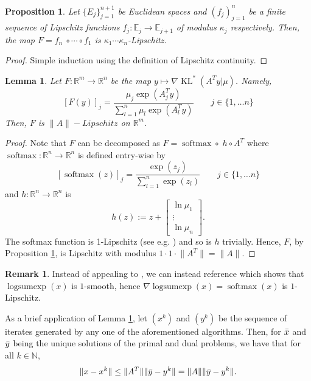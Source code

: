 \documentclass[10pt,a4paper]{article}
\numberwithin{equation}{section}
\newtheorem{proposition}[theorem]{Proposition}
\newtheorem{lemma}[theorem]{Lemma}
\theoremstyle{definition}
\newtheorem{remark}[theorem]{Remark}
\def\rr{{\mathbb R}}
\def\nn{{\mathbb N}}
\def\ee{{\mathbb E}}
\DeclareMathOperator{\logsumexp}{logsumexp}
\DeclareMathOperator{\softmax}{softmax}
\DeclareMathOperator{\KL}{KL}
\begin{document}
\begin{proposition}\label{prop:lipschitz_composition}
    Let $\{E_j\}_{j=1}^{n+1}$ be Euclidean spaces and $(f_j)_{j=1}^n$ be a finite sequence of Lipschitz functions $f_j: \ee_j \to \ee_{j+1}$ of modulus $\kappa_j$ respectively. Then, the map $F = f_n \ \circ \cdots \circ f_1$ is $\kappa_1 \cdots \kappa_n$-Lipschitz.
\end{proposition}
\begin{proof}
    Simple induction using the definition of Lipschitz continuity.
\end{proof}

\begin{lemma}\label{lem:primal_dual_bound}
    Let $F: \rr^m \to \rr^n$ be the map $y \mapsto \nabla \KL^\ast(A^Ty|\mu)$. Namely, 
    \[
    [F(y)]_j = \frac{\mu_j \exp(A_j^Ty)}{\sum_{l=1}^n \mu_l \exp(A_l^Ty)} \qquad j \in \{1, \dots n\}
    \]
    Then, $F$ is $\lVert A \rVert - Lipschitz$ on $\rr^m$.
\end{lemma}

\begin{proof}
    Note that $F$ can be decomposed as  $F = \softmax \circ \; h \circ A^T$ where $\softmax: \rr^n \to \rr^n$ is defined entry-wise by
    \[
    [\softmax(z)]_j = \frac{\exp(z_j)}{\sum_{l=1}^n \exp(z_l)} \qquad j \in \{1, \dots n\}
    \]
    and $h: \rr^n \to \rr^n$ is
\[
h(z) := z + \begin{bmatrix}
    \ln \mu_1 \\
    \vdots \\
    \ln \mu_n
\end{bmatrix}.
\]
The softmax function is 1-Lipschitz (see e.g. \cite[Proposition 4]{Gao2017OnTP}) and so is $h$ trivially. Hence, $F$, by Proposition \ref{prop:lipschitz_composition}, is Lipschitz with modulus $1 \cdot 1 \cdot \lVert A^T \rVert = \lVert A \rVert$.
\end{proof}

\begin{remark}
    Instead of appealing to \cite[Proposition 4]{Gao2017OnTP}, we can instead reference \cite[Example 5.15]{firstorderBeck} which shows that $\logsumexp(x)$ is $1$-smooth, hence $\nabla \logsumexp(x) = \softmax(x)$ is $1$-Lipschitz.
\end{remark}

As a brief application of Lemma \ref{lem:primal_dual_bound}, let $(x^k)$ and $(y^k)$ be the sequence of iterates generated by any one of the aforementioned algorithms. Then, for $\Bar{x}$ and $\Bar{y}$ being the unique solutions of the primal and dual problems, we have that for all $k \in \nn$,
\begin{equation}\label{eq:PrimalDual_bound}
\lVert x - x^k \rVert \leq \lVert A^T \rVert \lVert \Bar{y} - y^k \rVert = \lVert A \rVert \lVert \Bar{y} - y^k \rVert.
\end{equation}
\end{document}
